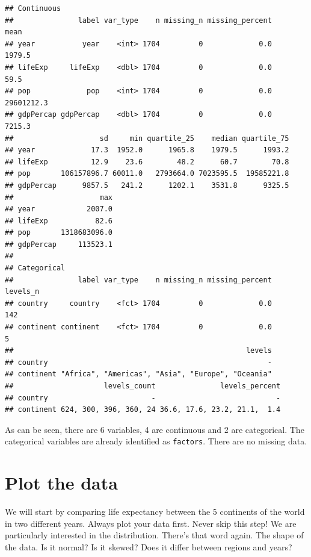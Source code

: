 \documentclass[12pt,]{krantz}
\theoremstyle{definition}
\theoremstyle{definition}
\theoremstyle{definition}
\theoremstyle{remark}
\begin{document}
\begin{verbatim}
## Continuous
##               label var_type    n missing_n missing_percent       mean
## year           year    <int> 1704         0             0.0     1979.5
## lifeExp     lifeExp    <dbl> 1704         0             0.0       59.5
## pop             pop    <int> 1704         0             0.0 29601212.3
## gdpPercap gdpPercap    <dbl> 1704         0             0.0     7215.3
##                    sd     min quartile_25    median quartile_75
## year             17.3  1952.0      1965.8    1979.5      1993.2
## lifeExp          12.9    23.6        48.2      60.7        70.8
## pop       106157896.7 60011.0   2793664.0 7023595.5  19585221.8
## gdpPercap      9857.5   241.2      1202.1    3531.8      9325.5
##                    max
## year            2007.0
## lifeExp           82.6
## pop       1318683096.0
## gdpPercap     113523.1
## 
## Categorical
##               label var_type    n missing_n missing_percent levels_n
## country     country    <fct> 1704         0             0.0      142
## continent continent    <fct> 1704         0             0.0        5
##                                                      levels
## country                                                   -
## continent "Africa", "Americas", "Asia", "Europe", "Oceania"
##                     levels_count               levels_percent
## country                        -                            -
## continent 624, 300, 396, 360, 24 36.6, 17.6, 23.2, 21.1,  1.4
\end{verbatim}

 

As can be seen, there are 6 variables, 4 are continuous and 2 are
categorical. The categorical variables are already identified as
\texttt{factors}. There are no missing data.

\hypertarget{plot-the-data}{%
\section{Plot the data}\label{plot-the-data}}

We will start by comparing life expectancy between the 5 continents of
the world in two different years. Always plot your data first. Never
skip this step! We are particularly interested in the distribution.
There's that word again. The shape of the data. Is it normal? Is it
skewed? Does it differ between regions and years?
\end{document}
